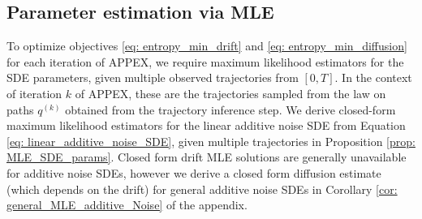 \documentclass[twoside,11pt]{article}
\newcommand{\todo}[1]{\textbf{\textcolor{red}{TODO: #1}}}
\begin{document}

\subsection{Parameter estimation via MLE}

To optimize objectives \eqref{eq: entropy_min_drift} and \eqref{eq: entropy_min_diffusion} for each iteration of APPEX, we require maximum likelihood estimators for the SDE parameters, given multiple observed trajectories from $[0,T]$. In the context of iteration $k$ of APPEX, these are the trajectories sampled from the law on paths $q^{(k)}$ obtained from the trajectory inference step. We derive closed-form maximum likelihood estimators for the linear additive noise SDE from  Equation \ref{eq: linear_additive_noise_SDE}, given multiple trajectories in Proposition \ref{prop: MLE_SDE_params}. Closed form drift MLE solutions are generally unavailable for additive noise SDEs, however we derive a closed form diffusion estimate (which depends on the drift) for general additive noise SDEs in Corollary \ref{cor: general_MLE_additive_Noise} of the appendix.
\end{document}
